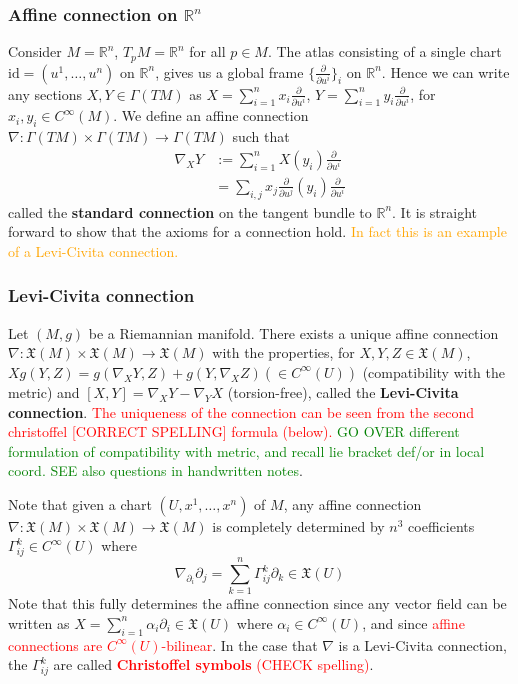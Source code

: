 \documentclass[a4paper]{article}
\theoremstyle{definition} \newtheorem*{definition}{Definition}
\theoremstyle{definition} \newtheorem*{definitions}{Definitions}
\theoremstyle{plain} \newtheorem{theorem}{Theorem}[section]
\theoremstyle{plain} \newtheorem{proposition}[theorem]{Proposition}
\theoremstyle{plain} \newtheorem{corollary}[theorem]{Corollary}
\theoremstyle{plain} \newtheorem{lemma}[theorem]{Lemma}
\theoremstyle{plain} \newtheorem{example}[theorem]{Example}
\newcommand{\checkCorrect}[1]{\textcolor{red}{#1}}
\newcommand{\understandBetter}[1]{\textcolor{orange}{#1}}
\newcommand{\finish}[1]{\textcolor{green}{#1}}
\newcommand{\defn}[1]{\textbf{#1}}
\newcommand{\realnos}{\mathbb{R}}
\newcommand{\smooth}{C^\infty}
\begin{document}
\subsubsection{Affine connection on $\realnos^n$}
Consider $M=\realnos^n$, $T_pM=\realnos^n$ for all $p\in M$.
The atlas consisting of a single chart $\text{id}=(u^1, \ldots, u^n)$ on $\realnos^n$, gives us a global frame $\{\frac{\partial}{\partial u^i}\}_i$ on $\realnos^n$. Hence we can write any sections $X, Y\in \Gamma(TM)$ as $X=\sum_{i=1}^n x_i \frac{\partial}{\partial u^i}$, $Y=\sum_{i=1}^n y_i \frac{\partial}{\partial u^i}$, for $x_i, y_i \in \smooth(M)$. We define an affine connection $\nabla:\Gamma(TM)\times \Gamma(TM)\to \Gamma(TM)$ such that 
\begin{align*}
\nabla_X Y & := \sum_{i=1}^n X(y_i) \frac{\partial}{\partial u^i} \\
& = \sum_{i, j} x_j\frac{\partial}{\partial u^j}(y_i)\frac{\partial}{\partial u^i}
\end{align*}
called the \defn{standard connection} on the tangent bundle to $\realnos^n$. It is straight forward to show that the axioms for a connection hold. \understandBetter{In fact this is an example of a Levi-Civita connection.}

\subsubsection{Levi-Civita connection}
Let $(M, g)$ be a Riemannian manifold. There exists a unique affine connection $\nabla:\mathfrak{X}(M)\times \mathfrak{X}(M)\to \mathfrak{X}(M)$ with the properties, for $X,Y,Z\in \mathfrak{X}(M)$,
$Xg(Y,Z)=g(\nabla_XY, Z)+g(Y, \nabla_XZ) (\in C^\infty(U))$ (compatibility with the metric) and $[X,Y]=\nabla_XY-\nabla_YX$ (torsion-free), called the \defn{Levi-Civita connection}. \checkCorrect{The uniqueness of the connection can be seen from the second christoffel [CORRECT SPELLING] formula (below).} \finish{GO OVER different formulation of compatibility with metric, and recall lie bracket def/or in local coord. SEE also questions in handwritten notes}.

Note that given a chart $(U, x^1, \ldots, x^n)$ of $M$, any affine connection $\nabla:\mathfrak{X}(M)\times \mathfrak{X}(M)\to \mathfrak{X}(M)$ is completely determined by $n^3$ coefficients $\Gamma^k_{ij}\in C^\infty (U)$ where
$$\nabla_{\partial_i}\partial_j=\sum_{k=1}^n \Gamma^k_{ij} \partial_k \in \mathfrak{X}(U)$$
Note that this fully determines the affine connection since any vector field can be written as $X=\sum_{i=1}^n \alpha_i \partial_i\in \mathfrak{X}(U)$ where $\alpha_i\in C^\infty (U)$, and since \checkCorrect{affine connections are $C^\infty(U)$-bilinear}. In the case that $\nabla$ is a Levi-Civita connection, the $\Gamma^k_{ij}$ are called \checkCorrect{\defn{Christoffel symbols} (CHECK spelling)}.
\end{document}
